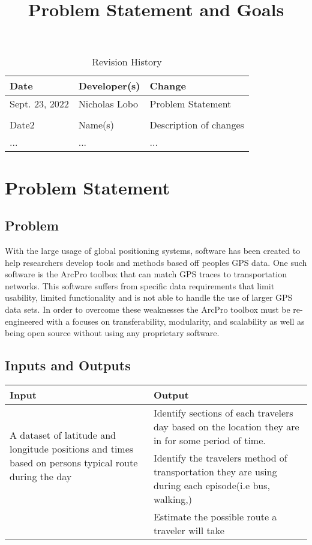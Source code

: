\documentclass{article}
\title{Problem Statement and Goals\\\progname}
\author{\authname}
\date{}
\begin{document}
\maketitle

\begin{table}[hp]
\caption{Revision History} \label{TblRevisionHistory}
\begin{tabularx}{\textwidth}{llX}
\toprule
\textbf{Date} & \textbf{Developer(s)} & \textbf{Change}\\
\midrule
Sept. 23, 2022 & Nicholas Lobo & Problem Statement\\\\
Date2 & Name(s) & Description of changes\\
... & ... & ...\\
\bottomrule
\end{tabularx}
\end{table}

\section{Problem Statement}



\subsection{Problem}
With the large usage of global positioning systems, software has been created to help researchers develop tools and methods based off peoples GPS data. 
One such software is the ArcPro toolbox that can match GPS traces to transportation networks. This software suffers from specific data requirements that limit usability, 
limited functionality and is not able to handle the use of larger GPS data sets. In order to overcome these weaknesses the ArcPro toolbox must be re-engineered with a focuses 
on transferability, modularity, and scalability as well as being open source without using any proprietary software. 

\subsection{Inputs and Outputs}
\begin{table}[h]
    \centering
    \begin{tabular}{|p{6cm}|p{6cm}|}
    \hline
    Input & Output  \\
    \hline
    \multirow{2}{5cm}{A dataset of latitude and longitude positions and times based on persons typical route during the day} & Identify sections of each travelers day based on the location they are in for some period of time.  \\\cline{2-2} 
    & Identify the travelers method of transportation they are using during each episode(i.e bus, walking,)  \\\cline{2-2} 
    & Estimate the possible route a traveler will take\\\cline{2-2} 
    \hline
    \end{tabular}
\end{table}
\end{document}
